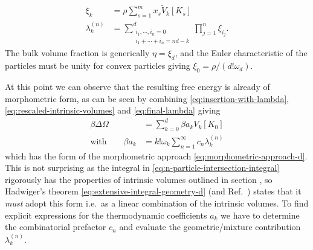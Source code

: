 \documentclass[11pt,twoside]{report}
\begin{document}
\begin{subequations}
  \begin{align}
    \label{eq:spt-variables-resummation}
    \xi_k
    &=
    \rho \sum_{s = 1}^m x_s \widetilde{V}_k[K_s]
    \\
    \label{eq:little-lambda}
    \lambda_k^{(n)}
    &=
    \sum_{\substack{i_1, \cdots, i_n = 0 \\ i_1 + \cdots + i_n = nd - k}}^d
    \prod_{j=1}^n
    \xi_{i_j}.
  \end{align}
\end{subequations}
The bulk volume fraction is generically $\eta = \xi_d$, and the Euler characteristic of the particles must be unity for convex particles giving $\xi_0 = \rho / (d! \omega_d)$.

At this point we can observe that the resulting free energy is already of morphometric form, as can be seen by combining \eqref{eq:insertion-with-lambda}, \eqref{eq:rescaled-intrinsic-volumes} and \eqref{eq:final-lambda} giving
\begin{subequations}\label{eq:morphometric-approach-from-virial}
  \begin{align}
    \beta \Delta \Omega
    &=
    \sum_{k=0}^d \beta a_k V_k[K_0]
    \\ \textrm{with} \qquad
    \beta a_k
    &=
    k! \omega_k \sum_{n=1}^\infty c_n \lambda_k^{(n)}
    \label{eq:a-coefficient}
  \end{align}
\end{subequations}
which has the form of the morphometric approach \eqref{eq:morphometric-approach-d}.
This is not surprising as the integral in \eqref{eq:n-particle-intersection-integral} rigorously has the properties of intrinsic volumes outlined in section \label{sec:morph-overview}, so Hadwiger's theorem \eqref{eq:extensive-integral-geometry-d} (and Ref.\ \cite{Hadwiger1957}) states that it \emph{must} adopt this form i.e.\ as a linear combination of the intrinsic volumes.
To find explicit expressions for the thermodynamic coefficients $a_k$ we have to determine the combinatorial prefactor $c_n$ and evaluate the geometric/mixture contribution $\lambda_k^{(n)}$.
\end{document}
